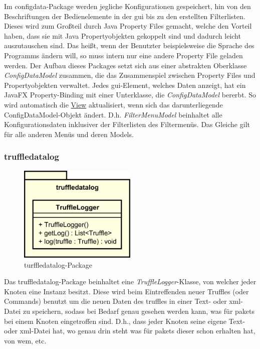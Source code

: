     \medskip
    Im configdata-Package werden jegliche Konfigurationen gespeichert, hin von den
    Beschriftungen der Bedienelemente in der \gls{gui} bis zu den erstellten Filterlisten. Dieses
    wird zum Großteil durch Java Property Files gemacht, welche den Vorteil haben, dass
    sie mit Java Propertyobjekten gekoppelt sind und dadurch leicht auszutauschen sind.
    Das heißt, wenn der Benutzter beispielsweise die Sprache des Programms ändern
    will, so muss intern nur eine andere Property File geladen werden.
    \newline
    \newline
    Der Aufbau dieses Packages setzt sich aus einer abstrakten Oberklasse
    \textit{ConfigDataModel} zusammen, die das Zusammenspiel zwischen Property Files
    und Propertyobjekten verwaltet. Jedes \gls{gui}-Element, welches Daten anzeigt, hat
    ein JavaFX Property-Binding mit einer Unterklasse, die \textit{ConfigDataModel}
    bererbt. So wird automatisch die \hyperref[subsec:view]{View} aktualisiert,
    wenn sich das darunterliegende ConfigDataModel-Objekt ändert. D.h.
    \textit{FilterMenuModel} beinhaltet alle Konfigurationsdaten inklusiver der
    Filterlisten des Filtermenüs. Das Gleiche gilt für alle anderen Menüs und
    deren Models.


    \subsubsection{truffledatalog}
    \label{subsubsec:graphlog}

    \begin{figure}[H]
      \centering
      \includegraphics[width=0.5\textwidth]{../diagramimages/truffledatalog.png}
      \caption{turffledatalog-Package}
    \end{figure}

    \medskip
    Das truffledatalog-Package beinhaltet eine \textit{TruffleLogger}-Klasse, von
    welcher jeder Knoten eine Instanz besitzt. Diese wird beim Eintreffenden neuer Truffles
    (oder Commands) benutzt um die neuen Daten des \glspl{truffle} in einer Text- oder xml-Datei zu speichern,
    sodass bei Bedarf genau gesehen werden kann, was für \glspl{paket} bei einem
    Knoten eingetroffen sind. D.h., dass jeder Knoten seine eigene Text- oder xml-Datei
    hat, wo genau drin steht was für \glspl{paket} dieser schon erhalten hat,
    von wem, etc.
